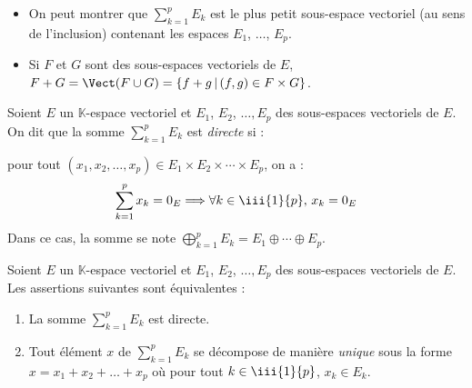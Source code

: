 \documentclass[french,11pt,twoside]{VcCours}
\newcommand{\Sum}[2]{\sum_{#1}^{#2}}
\begin{document}
\begin{Remarques}{}
\begin{itemize} 
\item On peut montrer que $\Sum{k=1}{p} E_k$ est le plus petit sous-espace vectoriel (au sens de l'inclusion) contenant les espaces $E_1$, $\ldots$, $E_p$. 
\item Si $F$ et $G$ sont des sous-espaces vectoriels de $E$, $F+G = \Vect(F \cup G) = \lbrace f+g \, \vert \, (f,g) \in F \times G\rbrace$.
\end{itemize}
\end{Remarques}{}

\begin{Definition}{} 
Soient $E$ un $\mathbb{K}$-espace vectoriel et $E_1$, $E_2$, $\ldots, E_p$ des sous-espaces vectoriels de $E$. On dit que la somme $\Sum{k=1}{p} E_k$ est \emph{directe} si :

pour tout $(x_1, x_2, \ldots, x_p) \in E_1 \times E_2 \times \cdots \times E_p$, on a :
$$ \sum_{k=1}^p x_k =0_E \Longrightarrow \forall k \in \iii{1}{p}, \, x_k = 0_E$$
Dans ce cas, la somme se note $\bigoplus_{k=1}^p E_k = E_1 \oplus \cdots \oplus E_p$.
\end{Definition}

\begin{Proposition}{}
Soient $E$ un $\mathbb{K}$-espace vectoriel et $E_1$, $E_2$, $\ldots, E_p$ des sous-espaces vectoriels de $E$. Les assertions suivantes sont équivalentes :
\begin{enumerate}
\item La somme $\Sum{k=1}{p} E_k$ est directe.
\item Tout élément $x$ de $\Sum{k=1}{p} E_k$ se décompose de manière \emph{unique} sous la forme $x = x_1 + x_2 + \ldots + x_p$ où pour tout $k \in \iii{1}{p}$, $x_k \in E_k$.
\end{enumerate}
\end{Proposition}
\end{document}
